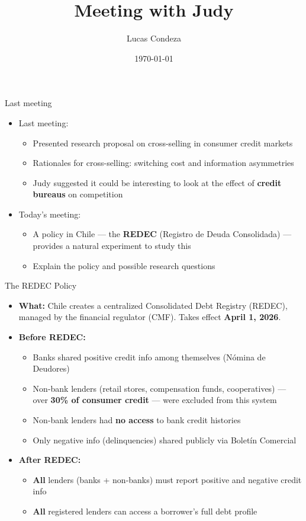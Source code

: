 \documentclass[10pt,aspectratio=169]{beamer}
\title{Meeting with Judy}
\author{%
 Lucas Condeza
\inst{1}
}
\institute{
  \inst{1} Yale University \\
}
\date{\today}
\begin{document}
\begin{frame}{Last meeting}
\begin{itemize}
    \item Last meeting:
    \begin{itemize}
    \item Presented research proposal on cross-selling in consumer credit markets
    \item Rationales for cross-selling: switching cost and information asymmetries 
    \item Judy suggested it could be interesting to look at the effect of \textbf{credit bureaus} on competition
\end{itemize}
\item Today's meeting:
\begin{itemize}
    \item A policy in Chile --- the \textbf{REDEC} (Registro de Deuda Consolidada) --- provides a natural experiment to study this
    \item Explain the policy and possible research questions
\end{itemize}
\end{itemize}
\end{frame}


\begin{frame}{The REDEC Policy}
\begin{itemize}
    \item \textbf{What:} Chile creates a centralized Consolidated Debt Registry (REDEC), managed by the financial regulator (CMF). Takes effect \textbf{April 1, 2026}.
    \item \textbf{Before REDEC:}
\begin{itemize}
    \item Banks shared positive credit info among themselves (N\'omina de Deudores)
    \item Non-bank lenders (retail stores, compensation funds, cooperatives) --- over \textbf{30\% of consumer credit} --- were excluded from this system
    \item Non-bank lenders had \textbf{no access} to bank credit histories
    \item Only negative info (delinquencies) shared publicly via Bolet\'in Comercial
\end{itemize}
    \item \textbf{After REDEC:}
\begin{itemize}
    \item \textbf{All} lenders (banks + non-banks) must report positive and negative credit info
    \item \textbf{All} registered lenders can access a borrower's full debt profile
\end{itemize}
\end{itemize}
\end{frame}
\end{document}

